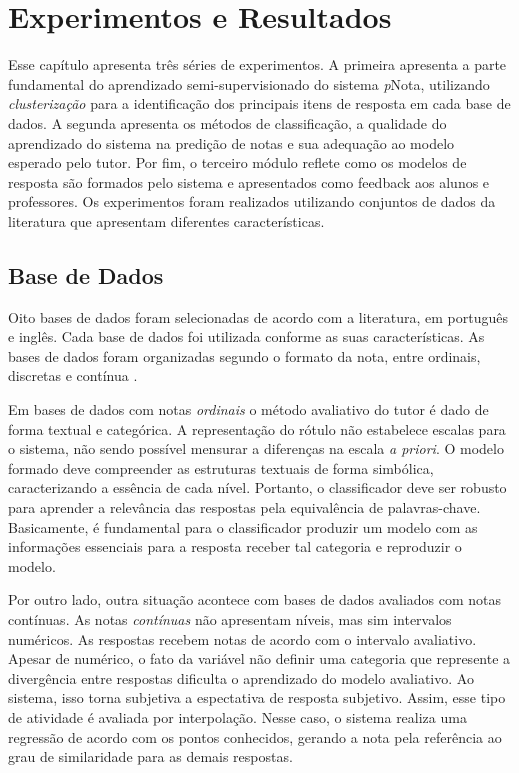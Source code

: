 \chapter{Experimentos e Resultados}
\label{cap-experimentos}

Esse capítulo apresenta três séries de experimentos. A primeira apresenta a parte fundamental do aprendizado semi-supervisionado do sistema \textit{p}Nota, utilizando \textit{clusterização} para a identificação dos principais itens de resposta em cada base de dados. A segunda apresenta os métodos de classificação, a qualidade do aprendizado do sistema na predição de notas e sua adequação ao modelo esperado pelo tutor. Por fim, o terceiro módulo reflete como os modelos de resposta são formados pelo sistema e apresentados como feedback aos alunos e professores. Os experimentos foram realizados utilizando conjuntos de dados da literatura que apresentam diferentes características.

\section{Base de Dados}
Oito bases de dados foram selecionadas de acordo com a literatura, em português e inglês. Cada base de dados foi utilizada conforme as suas características. As bases de dados foram organizadas segundo o formato da nota, entre ordinais, discretas e contínua \cite{morettin2010}.

Em bases de dados com notas \textit{ordinais} o método avaliativo do tutor é dado de forma textual e categórica. A representação do rótulo não estabelece escalas para o sistema, não sendo possível mensurar a diferenças na escala \textit{a priori}. O modelo formado deve compreender as estruturas textuais de forma simbólica, caracterizando a essência de cada nível. Portanto, o classificador deve ser robusto para aprender a relevância das respostas pela equivalência de palavras-chave. Basicamente, é fundamental para o classificador produzir um modelo com as informações essenciais para a resposta receber tal categoria e reproduzir o modelo.

Por outro lado, outra situação acontece com bases de dados avaliados com notas contínuas. As notas \textit{contínuas} não apresentam níveis, mas sim intervalos numéricos. As respostas recebem notas de acordo com o intervalo avaliativo. Apesar de numérico, o fato da variável não definir uma categoria que represente a divergência entre respostas dificulta o aprendizado do modelo avaliativo. Ao sistema, isso torna subjetiva a espectativa de resposta subjetivo. Assim, esse tipo de atividade é avaliada por interpolação. Nesse caso, o sistema realiza uma regressão de acordo com os pontos conhecidos, gerando a nota pela referência ao grau de similaridade para as demais respostas.

